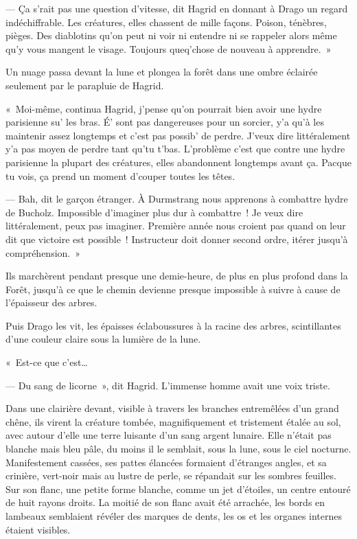 --- Ça s'rait pas une question d'vitesse, dit Hagrid en donnant à Drago un regard indéchiffrable.
Les créatures, elles chassent de mille façons.
Poison, ténèbres, pièges.
Des diablotins qu'on peut ni voir ni entendre ni se rappeler alors même qu'y vous mangent le visage.
Toujours queq'chose de nouveau à apprendre.~»

Un nuage passa devant la lune et plongea la forêt dans une ombre éclairée seulement par le parapluie de Hagrid.

«~Moi-même, continua Hagrid, j'pense qu'on pourrait bien avoir une hydre parisienne su' les bras.
É' sont pas dangereuses pour un sorcier, y'a qu'à les maintenir assez longtemps et c'est pas possib' de perdre.
J'veux dire littéralement y'a pas moyen de perdre tant qu'tu t'bas.
L'problème c'est que contre une hydre parisienne la plupart des créatures, elles abandonnent longtemps avant ça.
Pacque tu vois, ça prend un moment d'couper toutes les têtes.

--- Bah, dit le garçon étranger.
À Durmstrang nous apprenons à combattre hydre de Bucholz.
Impossible d'imaginer plus dur à combattre~!
Je veux dire littéralement, peux pas imaginer.
Première année nous croient pas quand on leur dit que victoire est possible~!
Instructeur doit donner second ordre, itérer jusqu'à compréhension.~»

Ils marchèrent pendant presque une demie-heure, de plus en plus profond dans la Forêt, jusqu'à ce que le chemin devienne presque impossible à suivre à cause de l'épaisseur des arbres.

Puis Drago les vit, les épaisses éclaboussures à la racine des arbres, scintillantes d'une couleur claire sous la lumière de la lune.

«~Est-ce que c'est…

--- Du sang de licorne~», dit Hagrid.
L'immense homme avait une voix triste.

Dans une clairière devant, visible à travers les branches entremêlées d'un grand chêne, ils virent la créature tombée, magnifiquement et tristement étalée au sol, avec autour d'elle une terre luisante d'un sang argent lunaire.
Elle n'était pas blanche mais bleu pâle, du moins il le semblait, sous la lune, sous le ciel nocturne.
Manifestement cassées, ses pattes élancées formaient d'étranges angles, et sa crinière, vert-noir mais au lustre de perle, se répandait sur les sombres feuilles.
Sur son flanc, une petite forme blanche, comme un jet d'étoiles, un centre entouré de huit rayons droits.
La moitié de son flanc avait été arrachée, les bords en lambeaux semblaient révéler des marques de dents, les os et les organes internes étaient visibles.


